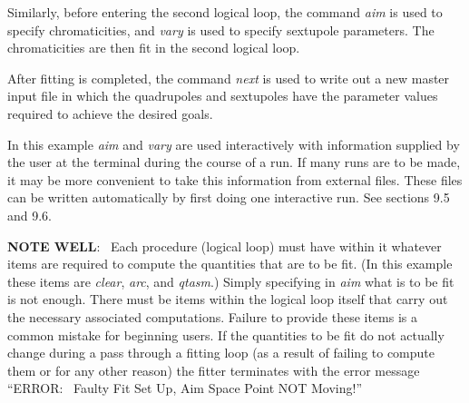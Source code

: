 Similarly, before entering the second logical loop, the command {\em aim} is used
to specify chromaticities, and {\em vary} is used to specify sextupole
parameters.  The chromaticities are then fit in the second logical loop.

After fitting is completed, the command {\em next} is used to write out a new master input
file in which the quadrupoles and sextupoles have the parameter values
required to achieve the desired goals.

In this example {\em aim} and {\em vary} are used interactively with
information supplied by the user at the terminal during the course of a
run.  If many runs are to be made, it may be more convenient to take this
information from external files.  These files can be written
automatically by first doing one interactive run.  See sections 9.5 and
9.6.

{\bf NOTE WELL}: \ Each procedure (logical loop) must have within it
whatever items are required to compute the quantities that are to be
fit.  (In this example these items are {\em clear}, {\em arc}, and {\em
qtasm}.)  Simply specifying in {\em aim} what is to be fit is not enough.
There must be items within the logical loop itself that carry out the
necessary associated computations.  Failure to provide these items is a
common mistake for beginning \Mary users.  If the quantities to be fit
do
not actually change during a pass through a fitting loop (as a result of
failing to compute them or for any other reason) the fitter terminates with the
error message ``ERROR: \ Faulty Fit Set Up, Aim Space Point NOT Moving!''

